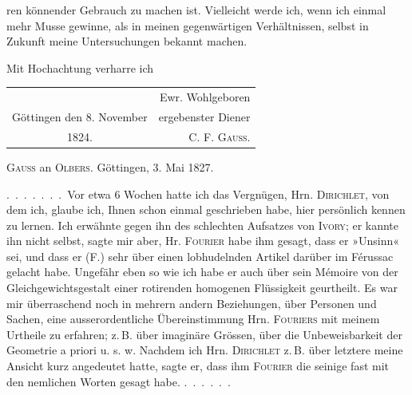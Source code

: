 ren könnender Gebrauch zu machen ist. Vielleicht werde ich, wenn ich einmal
mehr Musse gewinne, als in meinen gegenwärtigen Verhältnissen, selbst
in Zukunft meine Untersuchungen bekannt machen.

Mit Hochachtung verharre ich
\begin{center}
\begin{tabular}{@{}l@{\qquad}r@{}}
 & Ewr. Wohlgeboren\\
Göttingen den 8. November & ergebenster Diener\\
\multicolumn{1}{c}{1824.} & \textsc{C. F. Gauss.}
\end{tabular}
\end{center}
\medskip

\begin{center}
\textsc{Gauss} an \textsc{Olbers}. Göttingen, 3. Mai 1827.
\end{center}

.\ .\ .\ .\ .\ .\ .\ Vor etwa 6 Wochen hatte ich das Vergnügen, Hrn. \textsc{Dirichlet},
von dem ich, glaube ich, Ihnen schon einmal geschrieben habe, hier persönlich
kennen zu lernen. Ich erwähnte gegen ihn des schlechten Aufsatzes von
\textsc{Ivory}; er kannte ihn nicht selbst, sagte mir aber, Hr. \textsc{Fourier}
habe ihm gesagt, dass er »Unsinn« sei, und dass er (F.) sehr über einen
lobhudelnden Artikel darüber im Férussac gelacht habe. Ungefähr eben so wie
ich habe er auch über sein Mémoire von der Gleichgewichtsgestalt einer
rotirenden homogenen Flüssigkeit geurtheilt. Es war mir überraschend noch in
mehrern andern Beziehungen, über Personen und Sachen, eine ausserordentliche
Übereinstimmung Hrn. \textsc{Fouriers} mit meinem Urtheile zu erfahren; z.\,B.
über imaginäre Grössen, über die Unbeweisbarkeit der Geometrie a priori u. s.
w. Nachdem ich Hrn. \textsc{Dirichlet} z.\,B. über letztere meine Ansicht kurz
angedeutet hatte, sagte er, dass ihm \textsc{Fourier} die seinige fast mit den
nemlichen Worten gesagt habe. 
.\ .\ .\ .\ .\ .

